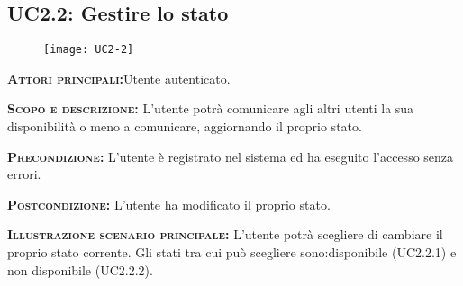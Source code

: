 \subsection{UC2.2: Gestire lo stato}
\begin{figure}[H]
\begin{center}
\texttt{[image: UC2-2]}
\caption{}\label{fig:}
\end{center}
\end{figure}
\begin{description}
\item{\scshape\bfseries Attori principali:}Utente autenticato.
\item{\scshape\bfseries Scopo e descrizione:} L'utente potrà comunicare agli altri utenti la sua disponibilità o meno a comunicare, aggiornando il proprio stato.
\item{\scshape\bfseries Precondizione:} L'utente è registrato nel sistema ed ha eseguito l'accesso senza errori.
\item{\scshape\bfseries Postcondizione:} L'utente ha modificato il proprio stato.
\item{\scshape\bfseries Illustrazione scenario principale:} L'utente potrà scegliere di cambiare il proprio stato corrente. Gli stati tra cui può scegliere sono:disponibile (UC2.2.1)  e non disponibile (UC2.2.2).
\end{description}

